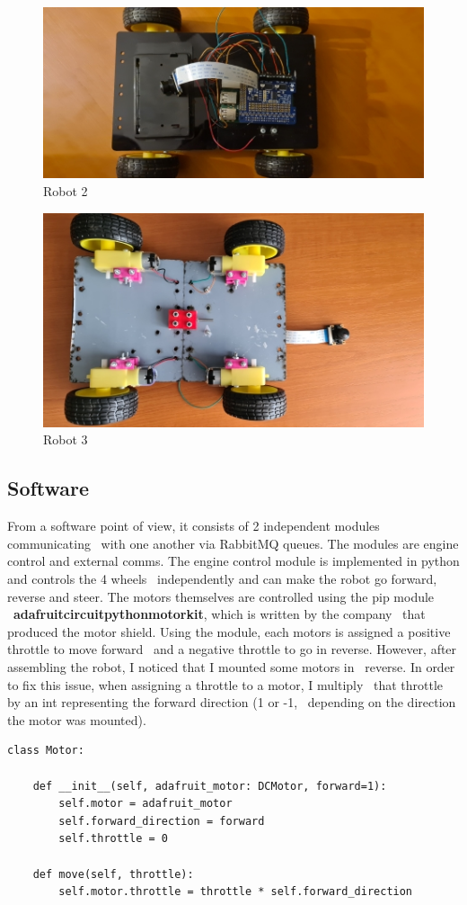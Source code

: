 \begin{figure}[ht]
    \label{fig:robot2}
    \includegraphics[keepaspectratio]{img/robot2d.jpg}
    \caption{Robot 2}
\end{figure}

\begin{figure}[ht]
    \label{fig:robot3}
    \includegraphics[keepaspectratio]{img/robot3d.jpg}
    \caption{Robot 3}
\end{figure}


\subsection{Software}
\label{subsec:implementation-robot-software}

From a software point of view, it consists of 2 independent modules communicating \
with one another via RabbitMQ queues.
The modules are engine control and external comms.
The engine control module is implemented in python and controls the 4 wheels \
independently and can make the robot go forward, reverse and steer.
The motors themselves are controlled using the pip module \
\textbf{adafruit\-circuitpython\-motorkit}, which is written by the company \
that produced the motor shield.
Using the module, each motors is assigned a positive throttle to move forward \
and a negative throttle to go in reverse.
However, after assembling the robot, I noticed that I mounted some motors in \
reverse.
In order to fix this issue, when assigning a throttle to a motor, I multiply \
that throttle by an int representing the forward direction (1 or -1, \
depending on the direction the motor was mounted).
\begin{verbatim}
class Motor:

    def __init__(self, adafruit_motor: DCMotor, forward=1):
        self.motor = adafruit_motor
        self.forward_direction = forward
        self.throttle = 0

    def move(self, throttle):
        self.motor.throttle = throttle * self.forward_direction
\end{verbatim}

